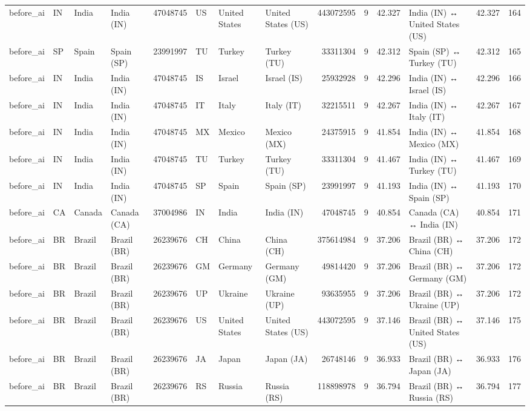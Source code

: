 \begin{tabular}{llllrlllrrrlrr}
before\_ai & IN & India & India (IN) & 47048745 & US & United States & United States (US) & 443072595 & 9 & 42.327 & India (IN) ↔ United States (US) & 42.327 & 164 \\
before\_ai & SP & Spain & Spain (SP) & 23991997 & TU & Turkey & Turkey (TU) & 33311304 & 9 & 42.312 & Spain (SP) ↔ Turkey (TU) & 42.312 & 165 \\
before\_ai & IN & India & India (IN) & 47048745 & IS & Israel & Israel (IS) & 25932928 & 9 & 42.296 & India (IN) ↔ Israel (IS) & 42.296 & 166 \\
before\_ai & IN & India & India (IN) & 47048745 & IT & Italy & Italy (IT) & 32215511 & 9 & 42.267 & India (IN) ↔ Italy (IT) & 42.267 & 167 \\
before\_ai & IN & India & India (IN) & 47048745 & MX & Mexico & Mexico (MX) & 24375915 & 9 & 41.854 & India (IN) ↔ Mexico (MX) & 41.854 & 168 \\
before\_ai & IN & India & India (IN) & 47048745 & TU & Turkey & Turkey (TU) & 33311304 & 9 & 41.467 & India (IN) ↔ Turkey (TU) & 41.467 & 169 \\
before\_ai & IN & India & India (IN) & 47048745 & SP & Spain & Spain (SP) & 23991997 & 9 & 41.193 & India (IN) ↔ Spain (SP) & 41.193 & 170 \\
before\_ai & CA & Canada & Canada (CA) & 37004986 & IN & India & India (IN) & 47048745 & 9 & 40.854 & Canada (CA) ↔ India (IN) & 40.854 & 171 \\
before\_ai & BR & Brazil & Brazil (BR) & 26239676 & CH & China & China (CH) & 375614984 & 9 & 37.206 & Brazil (BR) ↔ China (CH) & 37.206 & 172 \\
before\_ai & BR & Brazil & Brazil (BR) & 26239676 & GM & Germany & Germany (GM) & 49814420 & 9 & 37.206 & Brazil (BR) ↔ Germany (GM) & 37.206 & 172 \\
before\_ai & BR & Brazil & Brazil (BR) & 26239676 & UP & Ukraine & Ukraine (UP) & 93635955 & 9 & 37.206 & Brazil (BR) ↔ Ukraine (UP) & 37.206 & 172 \\
before\_ai & BR & Brazil & Brazil (BR) & 26239676 & US & United States & United States (US) & 443072595 & 9 & 37.146 & Brazil (BR) ↔ United States (US) & 37.146 & 175 \\
before\_ai & BR & Brazil & Brazil (BR) & 26239676 & JA & Japan & Japan (JA) & 26748146 & 9 & 36.933 & Brazil (BR) ↔ Japan (JA) & 36.933 & 176 \\
before\_ai & BR & Brazil & Brazil (BR) & 26239676 & RS & Russia & Russia (RS) & 118898978 & 9 & 36.794 & Brazil (BR) ↔ Russia (RS) & 36.794 & 177 \\

\end{tabular}
